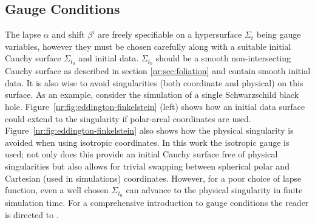 \subsection{Gauge Conditions}\label{nr:sec:gaugeconditions}

The lapse $\alpha$ and shift $\beta^i$ are freely specifiable on a hypersurface
$\Sigma_t$ being gauge variables, however they must be chosen carefully along with
a suitable initial Cauchy surface $\Sigma_{t_0}$ and initial data. $\Sigma_{t_0}$
should be a smooth non-intersecting Cauchy surface as described in section
\ref{nr:sec:foliation} and contain smooth initial data. It is also wise to avoid
singularities (both coordinate and physical) on this surface. As an example,
consider the simulation of a single Schwarzschild black hole.
Figure~\ref{nr:fig:eddington-finkelstein} (left) shows how an initial data
surface could extend to the singularity if polar-areal coordinates are used.
Figure~\ref{nr:fig:eddington-finkelstein} also shows how the physical singularity
is avoided when using isotropic coordinates. In this work the isotropic gauge is
used; not only does this provide an initial Cauchy surface free of physical
singularities but also allows for trivial swapping between spherical polar and
Cartesian (used in simulations) coordinates. However, for a poor choice of
lapse function, even a well chosen $\Sigma_{t_0}$ can advance to the physical
singularity in finite simulation time.  For a comprehensive introduction to gauge
conditions the reader is directed to
\cite{baumgarte_shapiro_2010,alcubierre2008introduction,gourgoulhon20073+}.


